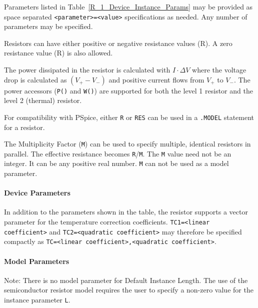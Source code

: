 \begin{Device}
\begin{Parameters}
Parameters listed in Table~\ref{R_1_Device_Instance_Params} may be provided as
space separated \texttt{<parameter>=<value>} specifications as needed.
Any number of parameters may be specified.

\end{Parameters}

\comments

Resistors can have either positive or negative resistance values (R).  A zero 
resistance value (R) is also allowed. 

The power dissipated in the resistor is calculated 
with $I \cdot \Delta V$ where the voltage drop is calculated as $(V_+ - V_-)$ 
and positive current flows from $V_+$ to $V_-$.  The power accessors
(\texttt{P()} and \texttt{W()}) are supported for both the level 1 resistor
and the level 2 (thermal) resistor.

For compatibility with PSpice, either \texttt{R} or \texttt{RES} can be used in a
\texttt{.MODEL} statement for a resistor.

The Multiplicity Factor (\texttt{M}) can be used to specify multiple, identical 
resistors in parallel. The effective resistance becomes \texttt{R}/\texttt{M}.  
The \texttt{M} value need not be an integer.  It can be any positive real number.  
\texttt{M} can not be used as a model parameter. 

\end{Device}

\newpage

\paragraph{Device Parameters}


In addition to the parameters shown in the table, the resistor supports a vector parameter for the temperature correction coefficients.  \texttt{TC1=<linear coefficient>} and \texttt{TC2=<quadratic coefficient>} may therefore be specified compactly as \texttt{TC=<linear coefficient>,<quadratic coefficient>}.

\paragraph{Model Parameters}


Note: There is no model parameter for Default Instance Length.  The use of the semiconductor resistor model requires
the user to specify a non-zero value for the instance parameter \texttt{L}. 

